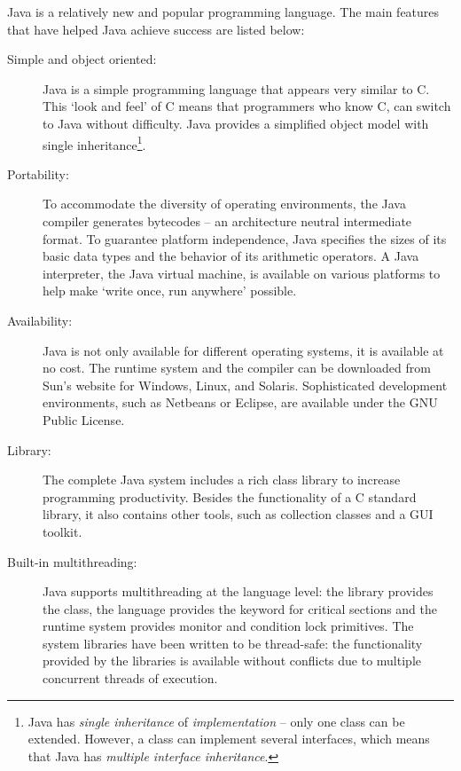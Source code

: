 Java is a relatively new and popular programming language. The main
features that have helped Java achieve success are listed below:
%
\begin{description}
    \item[Simple and object oriented:] Java is a simple
        programming language that appears very similar to C. This
        `look and feel' of C means that programmers who know C,
        can switch to Java without difficulty. Java provides a
        simplified object model with single
        inheritance\footnote{Java has \emph{single inheritance}
        of \emph{implementation} -- only one class can be
        extended. However, a class can implement several
        interfaces, which means that Java has \emph{multiple
        interface inheritance}.}.

    \item[Portability:]
To accommodate the diversity of operating environments, the Java
compiler generates bytecodes -- an architecture neutral intermediate
format. To guarantee platform independence, Java specifies the sizes
of its basic data types and the behavior of its arithmetic
operators. A Java interpreter, the Java virtual machine, is
available on various platforms to help make `write once, run
anywhere' possible.

    \item[Availability:] Java is not only available for different
        operating systems, it is available at no cost. The
        runtime system and the compiler can be downloaded from
        Sun's website for Windows, Linux, and Solaris.
        Sophisticated development environments, such as Netbeans
        or Eclipse, are available under the GNU Public License.

    \item[Library:] The complete Java system includes a rich
        class library to increase programming productivity.
        Besides the functionality of a C standard library, it
        also contains other tools, such as collection classes and
        a GUI toolkit.

    \item[Built-in multithreading:]
Java supports multithreading at the language level: the library
provides the  class, the language provides the keyword
 for critical sections and the runtime system
provides monitor and condition lock primitives. The system libraries
have been written to be thread-safe: the functionality provided by
the libraries is available without conflicts due to multiple
concurrent threads of execution.


\end{description}
